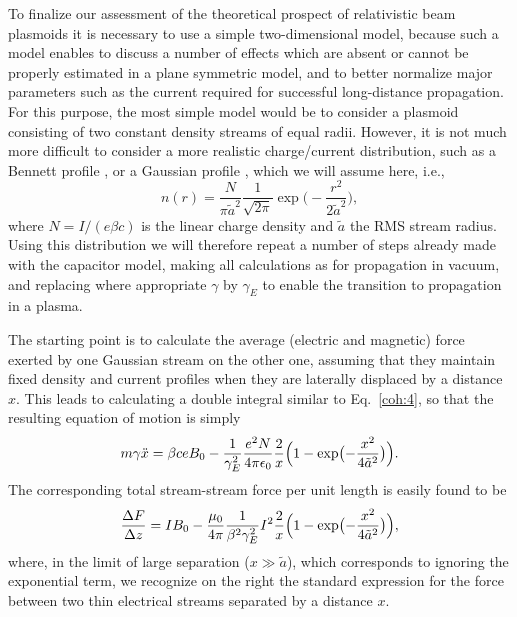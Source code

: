 \documentclass [12pt,a4paper,     ]{report} %
\begin{document}
   To finalize our assessment of the theoretical prospect of relativistic beam plasmoids it is necessary to use a simple two-dimensional model, because such a model enables to discuss a number of effects which are absent or cannot be properly estimated in a plane symmetric model, and to better normalize major parameters such as the current required for successful long-distance propagation.  For this purpose, the most simple model would be to consider a plasmoid consisting of two constant density streams of equal radii.  However, it is not much more difficult to consider a more realistic charge/current distribution, such as a Bennett profile \cite{ZHANG1989-}, or a Gaussian profile \cite{NGUYE1985-}, which we will assume here, i.e.,
%
\begin{equation}\label{gau:1} %
     n(r) = \frac{N}{\pi \tilde{a}^2}
            \frac{1}{\sqrt{2\pi}} \exp\bigl( -\frac{r^2}{2\tilde{a}^2}\bigr),
\end{equation}
%
where $N=I/(e\beta c)$ is the linear charge density and $\tilde{a}$ the RMS stream radius.  Using this distribution we will therefore repeat a number of steps already made with the capacitor model, making all calculations as for propagation in vacuum, and replacing where appropriate $\gamma$ by $\gamma_E$ to enable the transition to  propagation in a plasma.

  The starting point is to calculate the average (electric and magnetic) force exerted by one Gaussian stream on the other one, assuming that they maintain fixed density and current profiles when they are laterally displaced by a distance $x$.  This leads to calculating a double integral similar to Eq.~\eqref{coh:4}, so that the resulting equation of motion is simply \cite{ZHANG1989-}
%
\begin{equation}\label{gau:2} %
    m\gamma \ddot{x} = \beta c e B_0   -
            \frac{1}{\gamma^2_E} \frac{e^2 N}{4\pi \epsilon_0}
            \frac{2}{x}\Bigl(1-\exp\bigl( -\frac{x^2}{4\tilde{a}^2}\bigr)\Bigr).
\end{equation}
%
The corresponding total stream-stream force per unit length is easily found to be
%
\begin{equation}\label{gau:3} %
            \frac{\Delta F}{\Delta z} =  I B_0  -
            \frac{\mu_0}{4\pi} \frac{1}{\beta^2\gamma^2_E} I^2
            \frac{2}{x}\Bigl(1-\exp\bigl( -\frac{x^2}{4\tilde{a}^2}\bigr)\Bigr),
\end{equation}
%
where, in the limit of large separation ($x \gg \tilde{a}$), which corresponds to ignoring the exponential term, we recognize on the right the standard expression for the force between two thin electrical streams separated by a distance $x$.
\end{document}
